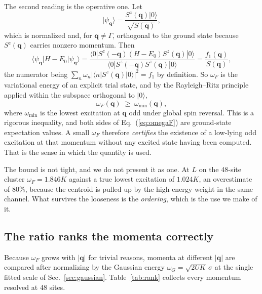 \documentclass[
aps,
prl,
onecolumn,
amsmath,
amssymb,
superscriptaddress,
longbibliography
]{revtex4-2}
\newcommand{\bq}{\bm q}
\begin{document}
The second reading is the operative one. Let
\begin{equation}
|\psi_{\bq}\rangle
=
\frac{S^z(\bq)|0\rangle}{\sqrt{S(\bq)}},
\end{equation}
which is normalized and, for $\bq\neq\Gamma$, orthogonal to the ground
state because $S^z(\bq)$ carries nonzero momentum. Then
\begin{equation}
\langle\psi_{\bq}|H-E_0|\psi_{\bq}\rangle
=
\frac{\langle0|S^z(-\bq)(H-E_0)S^z(\bq)|0\rangle}
{\langle0|S^z(-\bq)S^z(\bq)|0\rangle}
=
\frac{f_1(\bq)}{S(\bq)},
\end{equation}
the numerator being $\sum_n\omega_n|\langle n|S^z(\bq)|0\rangle|^2=f_1$
by definition. So $\omega_F$ is the variational energy of an explicit
trial state, and by the Rayleigh--Ritz principle applied within the
subspace orthogonal to $|0\rangle$,
\begin{equation}
\omega_F(\bq)\;\geq\;\omega_{\min}(\bq),
\end{equation}
where $\omega_{\min}$ is the lowest excitation at $\bq$ odd under
global spin reversal. This is a rigorous inequality, and both sides of
Eq.~(\ref{eq:omegaF}) are ground-state expectation values. A small
$\omega_F$ therefore \emph{certifies} the existence of a low-lying
odd excitation at that momentum without any excited state having been
computed. That is the sense in which the quantity is used.

The bound is not tight, and we do not present it as one. At $L$ on the
48-site cluster $\omega_F=1.846K$ against a true lowest excitation of
$1.024K$, an overestimate of $80\%$, because the centroid is pulled up
by the high-energy weight in the same channel. What survives the
looseness is the \emph{ordering}, which is the use we make of it.

\subsection{The ratio ranks the momenta correctly}
\label{sec:rank}

Because $\omega_F$ grows with $|\bq|$ for trivial reasons, momenta at
different $|\bq|$ are compared after normalizing by the Gaussian
energy $\omega_G=\sqrt{2UK}\,\sigma$ at the single fitted scale of
Sec.~\ref{sec:gaussian}. Table~\ref{tab:rank} collects every momentum
resolved at 48 sites.
\end{document}
